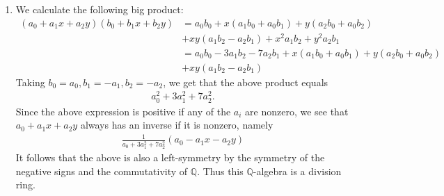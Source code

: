 \documentclass[12pt]{article}
\theoremstyle{definitionstyle}
\def\mbb#1{\mathbb{#1}}
\newcommand{\Q}{\mbb Q}
\begin{document}
\begin{enumerate}
        \item We calculate the following big product:
        \begin{align*}
            (a_0 + a_1x + a_2y)(b_0 + b_1x + b_2y) &= a_0b_0 + x(a_1b_0+a_0b_1) + y(a_2b_0+a_0b_2) \\&+ xy(a_1b_2-a_2b_1) + x^2a_1b_2 + y^2a_2b_1 \\
            &= a_0b_0 - 3a_1b_2 - 7a_2b_1 + x(a_1b_0+a_0b_1) + y(a_2b_0+a_0b_2) \\&+ xy(a_1b_2-a_2b_1)
        \end{align*}
        Taking $b_0 = a_0, b_1=-a_1, b_2 = -a_2$, we get that the above product equals
        \begin{align*}
            a_0^2 + 3a_1^2 + 7a_2^2.
        \end{align*}
        Since the above expression is positive if any of the $a_i$ are nonzero, we see that $a_0+a_1x+a_2y$ always has an inverse if it is nonzero, namely
        \begin{align*}
            \frac{1}{a_0+3a_1^2+7a_2^2} (a_0-a_1x-a_2y)
        \end{align*}
        It follows that the above is also a left-symmetry by the symmetry of the negative signs and the commutativity of $\Q$. Thus this $\Q$-algebra is a division ring.
    \end{enumerate}
\end{document}
